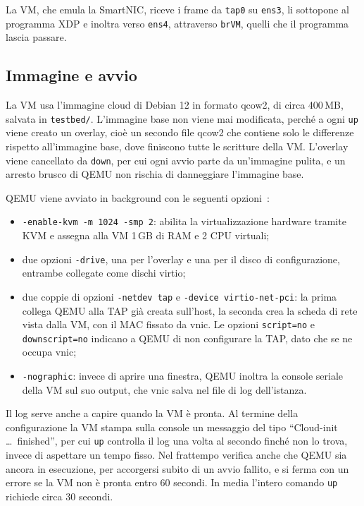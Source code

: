 La VM, che emula la SmartNIC, riceve i frame da \texttt{tap0} su \texttt{ens3}, li sottopone al programma XDP e inoltra verso \texttt{ens4}, attraverso \texttt{brVM}, quelli che il programma lascia passare.

\subsection{Immagine e avvio}

La VM usa l'immagine cloud di Debian 12 in formato qcow2, di circa 400\,MB, salvata in \texttt{testbed/}. L'immagine base non viene mai modificata, perché a ogni \texttt{up} viene creato un overlay, cioè un secondo file qcow2 che contiene solo le differenze rispetto all'immagine base, dove finiscono tutte le scritture della VM. L'overlay viene cancellato da \texttt{down}, per cui ogni avvio parte da un'immagine pulita, e un arresto brusco di QEMU non rischia di danneggiare l'immagine base.

QEMU viene avviato in background con le seguenti opzioni~\cite{qemu-networking}:
\begin{itemize}
    \item \texttt{-enable-kvm -m 1024 -smp 2}: abilita la virtualizzazione hardware tramite KVM e assegna alla VM 1\,GB di RAM e 2 CPU virtuali;
    \item due opzioni \texttt{-drive}, una per l'overlay e una per il disco di configurazione, entrambe collegate come dischi virtio;
    \item due coppie di opzioni \texttt{-netdev tap} e \texttt{-device virtio-net-pci}: la prima collega QEMU alla TAP già creata sull'host, la seconda crea la scheda di rete vista dalla VM, con il MAC fissato da vnic. Le opzioni \texttt{script=no} e \texttt{downscript=no} indicano a QEMU di non configurare la TAP, dato che se ne occupa vnic;
    \item \texttt{-nographic}: invece di aprire una finestra, QEMU inoltra la console seriale della VM sul suo output, che vnic salva nel file di log dell'istanza.
\end{itemize}

Il log serve anche a capire quando la VM è pronta. Al termine della configurazione la VM stampa sulla console un messaggio del tipo ``Cloud-init \dots\ finished'', per cui \texttt{up} controlla il log una volta al secondo finché non lo trova, invece di aspettare un tempo fisso. Nel frattempo verifica anche che QEMU sia ancora in esecuzione, per accorgersi subito di un avvio fallito, e si ferma con un errore se la VM non è pronta entro 60 secondi. In media l'intero comando \texttt{up} richiede circa 30 secondi.

